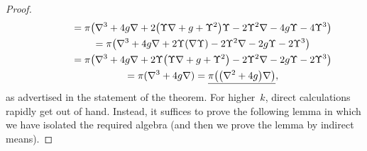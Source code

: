 \begin{proof}
\begin{gather*}
\hphantom{\underline{\pi\big(\hat\nabla^3\phi\big)}}{} = \pi\big(\nabla^3+4g\nabla+2\big(\Upsilon\nabla+g+\Upsilon^2\big)\Upsilon
-2\Upsilon^2\nabla-4g\Upsilon-4\Upsilon^3\big)\\
\hphantom{\underline{\pi\big(\hat\nabla^3\phi\big)}}{} = \pi\big(\nabla^3+4g\nabla+2\Upsilon(\nabla\Upsilon)
-2\Upsilon^2\nabla-2g\Upsilon-2\Upsilon^3\big)\\
\hphantom{\underline{\pi\big(\hat\nabla^3\phi\big)}}{} = \pi\big(\nabla^3+4g\nabla+2\Upsilon\big(\Upsilon\nabla+g+\Upsilon^2\big)
-2\Upsilon^2\nabla-2g\Upsilon-2\Upsilon^3\big)\\
\hphantom{\underline{\pi\big(\hat\nabla^3\phi\big)}}{} = \pi(\nabla^3+4g\nabla) =
\underline{\pi\big(\big(\nabla^2+4g\big)\nabla\big)},
\end{gather*}
as advertised in the statement of the theorem. For higher~$k$, direct
calculations rapidly get out of hand. Instead, it suf\/f\/ices to prove the
following lemma in which we have isolated the required algebra (and then we
prove the lemma by indirect means).
\end{proof}

